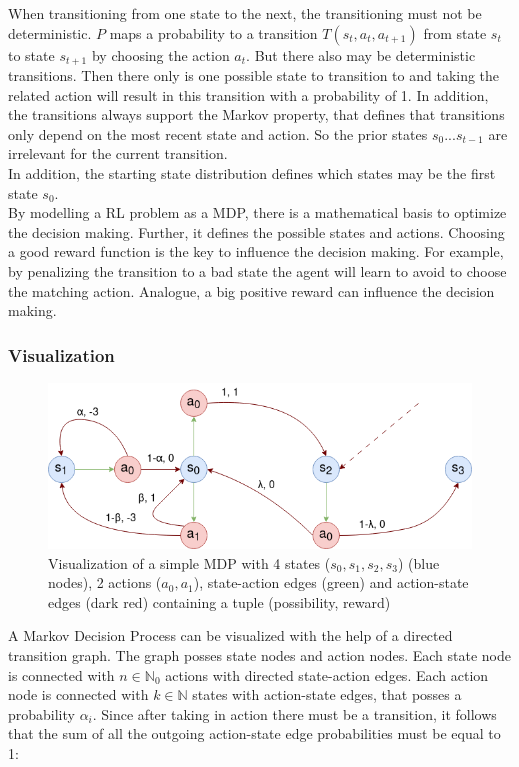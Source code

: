 When transitioning from one state to the next, the transitioning must not be deterministic. $P$ maps a probability to a transition $T(s_t,a_t,a_{t+1})$ from state $s_t$ to state $s_{t+1}$ by choosing the action $a_t$. But there also may be deterministic transitions. Then there only is one possible state to transition to and taking the related action will result in this transition with a probability of 1. In addition, the transitions always support the Markov property, that defines that transitions only depend on the most recent state and action. So the prior states $s_0 ... s_{t-1}$ are irrelevant for the current transition.\\
In addition, the starting state distribution defines which states may be the first state $s_0$. \\
\newline
By modelling a RL problem as a MDP, there is a mathematical basis to optimize the decision making. Further, it defines the possible states and actions. Choosing a good reward function is the key to influence the decision making. For example, by penalizing the transition to a bad state the agent will learn to avoid to choose the matching action. Analogue, a big positive reward can influence the decision making.

\newpage

\subsubsection{Visualization}
\begin{figure}
	\centering
	\includegraphics[width=\linewidth]{figures/visMdp.png}
	\caption{Visualization of a simple MDP with 4 states ($s_0, s_1, s_2, s_3$) (blue nodes), 2 actions ($a_0, a_1$), state-action edges (green) and action-state edges (dark red) containing a tuple (possibility, reward)}
	\label{fig:vismdp}
\end{figure}
A Markov Decision Process can be visualized with the help of a directed transition graph. The graph posses state nodes and action nodes. Each state node is connected with $n \in \mathbb{N}_0$ actions with directed state-action edges. Each action node is connected with $k \in \mathbb{N}$ states with action-state edges, that posses a probability $\alpha_i$. Since after taking in action there must be a transition, it follows that the sum of all the outgoing action-state edge probabilities must be equal to 1:

